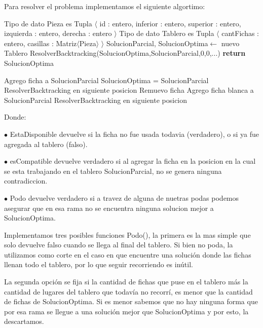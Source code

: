 Para resolver el problema implementamos el siguiente algortimo:

\begin{pseudo}
\State Tipo de dato Pieza es Tupla $\langle$ id : entero, inferior : entero, superior : entero, izquierda : entero, derecha : entero $\rangle$
\State Tipo de dato Tablero es Tupla $\langle$ cantFichas : entero, casillas : Matriz$\langle$Pieza$\rangle$ $\rangle$
        \State SolucionParcial, SolucionOptima$\leftarrow$ nuevo Tablero
        \State ResolverBacktracking(SolucionOptima,SolucionParcial,0,0,...) 
        \State \textbf{return} SolucionOptima
    \EndProcedure
\end{pseudo}

\begin{pseudo}

	    \State Agrego ficha a SolucionParcial
	      \State SolucionOptima = SolucionParcial
	    \EndIf
	      \State ResolverBacktracking en siguiente posicion
	    \EndIf
	    \State Remuevo ficha 
	  \EndIf
	\EndFor
        \State Agrego ficha blanca a SolucionParcial
        \State ResolverBacktracking en siguiente posicion
    \EndProcedure
\end{pseudo}

Donde: 

$\bullet$ EstaDisponible devuelve si la ficha no fue usada todavia (verdadero), o si ya fue agregada al tablero (falso).

$\bullet$ esCompatible devuelve verdadero si al agregar la ficha en la posicion en la cual se esta trabajando en el tablero SolucionParcial, no se genera ninguna contradiccion.

$\bullet$ Podo devuelve verdadero si a travez de alguna de nuetras podas podemos asegurar que en esa rama no se encuentra ninguna solucion mejor a SolucionOptima.

Implementamos tres posibles funciones Podo(), la primera es la mas simple que solo devuelve falso cuando se llega al final del tablero. Si bien no poda, la utilizamos como corte en el caso en que encuentre una solución donde las fichas llenan todo el tablero, por lo que seguir recorriendo es inútil.

La segunda opción se fija si la cantidad de fichas que puse en el tablero más la cantidad de lugares del tablero que todavía no recorrí, es menor que la cantidad de fichas de SolucionOptima. Si es menor sabemos que no hay ninguna forma que por esa rama se llegue a una solución mejor que SolucionOptima y por esto, la descartamos.

